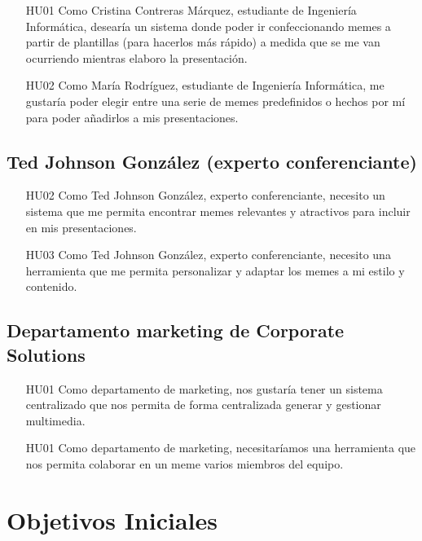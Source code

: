    \begin{enumerate}
        \item [HU01] Como Cristina Contreras Márquez, estudiante de Ingeniería Informática, desearía un sistema donde poder ir confeccionando memes a partir de plantillas (para hacerlos más rápido) a medida que se me van ocurriendo mientras elaboro la presentación.
        \item [HU02] Como María Rodríguez, estudiante de Ingeniería Informática, me gustaría poder elegir entre una serie de memes predefinidos o hechos por mí para poder añadirlos a mis presentaciones.
    \end{enumerate}

    \subsection{Ted Johnson González (experto conferenciante)}

        \begin{enumerate}
            \item [HU02] Como Ted Johnson González, experto conferenciante, necesito un sistema que me permita encontrar memes relevantes y atractivos para incluir en mis presentaciones.
            \item [HU03] Como Ted Johnson González, experto conferenciante, necesito una herramienta que me permita personalizar y adaptar los memes a mi estilo y contenido.
        \end{enumerate}

    \subsection{Departamento marketing de Corporate Solutions}

        \begin{enumerate}
            \item [HU01] Como departamento de marketing, nos gustaría tener un sistema centralizado que nos permita de forma centralizada generar y gestionar multimedia.
            \item [HU01] Como departamento de marketing, necesitaríamos una herramienta que nos permita colaborar en un meme varios miembros del equipo.
        \end{enumerate}

\section{Objetivos Iniciales}

